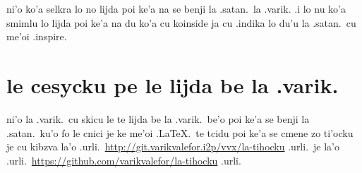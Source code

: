 \documentclass{article}
\begin{document}
ni'o ko'a selkra lo no lijda poi ke'a na se benji la .satan.\ la .varik.  .i lo nu ko'a smimlu lo lijda poi ke'a na du ko'a cu koinside ja cu .indika lo du'u la .satan.\ cu me'oi .inspire.

\section{le cesycku pe le lijda be la .varik.}
ni'o la .varik.\ cu skicu le te lijda be la .varik.\ be'o poi ke'a se benji la .satan.\ ku'o fo le cnici je ke me'oi .\LaTeX.\ te tcidu poi ke'a se cmene zo ti'ocku je cu kibzva la'o .urli.\ \url{http://git.varikvalefor.i2p/vvx/la-tihocku} .urli.\ je la'o .urli.\ \url{https://github.com/varikvalefor/la-tihocku} .urli.
\end{document}
